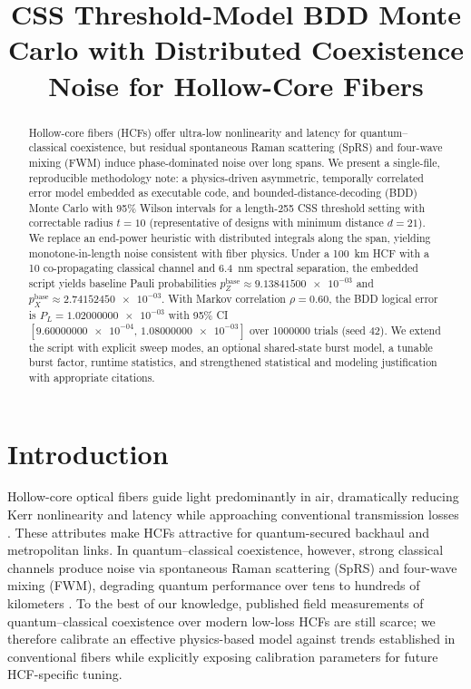 \documentclass[conference]{IEEEtran}
\newcommand{\nexact}[1]{\num[round-mode=off]{#1}}
\newcommand{\simL}{100}
\newcommand{\simpcl}{10}
\newcommand{\simsep}{6.4}
\newcommand{\simn}{255}
\newcommand{\simtrials}{1000000}
\newcommand{\simseed}{42}
\newcommand{\simpz}{9.13841500e-03}
\newcommand{\simpx}{2.74152450e-03}
\newcommand{\simrhoB}{0.60}
\newcommand{\simpLB}{1.02000000e-03}
\newcommand{\simpLBlo}{9.60000000e-04}
\newcommand{\simpLBhi}{1.08000000e-03}
\begin{document}
\title{CSS Threshold-Model BDD Monte Carlo with Distributed Coexistence Noise for Hollow-Core Fibers}

\author{}

\maketitle

\begin{abstract}
Hollow-core fibers (HCFs) offer ultra-low nonlinearity and latency for quantum--classical coexistence, but residual spontaneous Raman scattering (SpRS) and four-wave mixing (FWM) induce phase-dominated noise over long spans. We present a single-file, reproducible methodology note: a physics-driven asymmetric, temporally correlated error model embedded as executable code, and bounded-distance-decoding (BDD) Monte Carlo with 95\% Wilson intervals for a length-\nexact{\simn} CSS threshold setting with correctable radius \(t=10\) (representative of designs with minimum distance \(d=21\)). We replace an end-power heuristic with distributed integrals along the span, yielding monotone-in-length noise consistent with fiber physics. Under a \SI{\simL}{\kilo\meter} HCF with a \SI{\simpcl}{\dBm} co-propagating classical channel and \SI{\simsep}{\nano\meter} spectral separation, the embedded script yields baseline Pauli probabilities \(p_Z^{\text{base}}\approx \nexact{\simpz}\) and \(p_X^{\text{base}}\approx \nexact{\simpx}\). With Markov correlation \(\rho=\nexact{\simrhoB}\), the BDD logical error is \(P_L=\nexact{\simpLB}\) with 95\% CI \([\nexact{\simpLBlo},\,\nexact{\simpLBhi}]\) over \nexact{\simtrials} trials (seed \nexact{\simseed}). We extend the script with explicit sweep modes, an optional shared-state burst model, a tunable burst factor, runtime statistics, and strengthened statistical and modeling justification with appropriate citations.
\end{abstract}

\section{Introduction}
Hollow-core optical fibers guide light predominantly in air, dramatically reducing Kerr nonlinearity and latency while approaching conventional transmission losses \cite{Benabid2006JLT,Poletti2014OPEX}. These attributes make HCFs attractive for quantum-secured backhaul and metropolitan links. In quantum--classical coexistence, however, strong classical channels produce noise via spontaneous Raman scattering (SpRS) and four-wave mixing (FWM), degrading quantum performance over tens to hundreds of kilometers \cite{Eraerds2010NJP,Patel2012PRX,Kumar2015NJP}. To the best of our knowledge, published field measurements of quantum--classical coexistence over modern low-loss HCFs are still scarce; we therefore calibrate an effective physics-based model against trends established in conventional fibers while explicitly exposing calibration parameters for future HCF-specific tuning.
\end{document}
